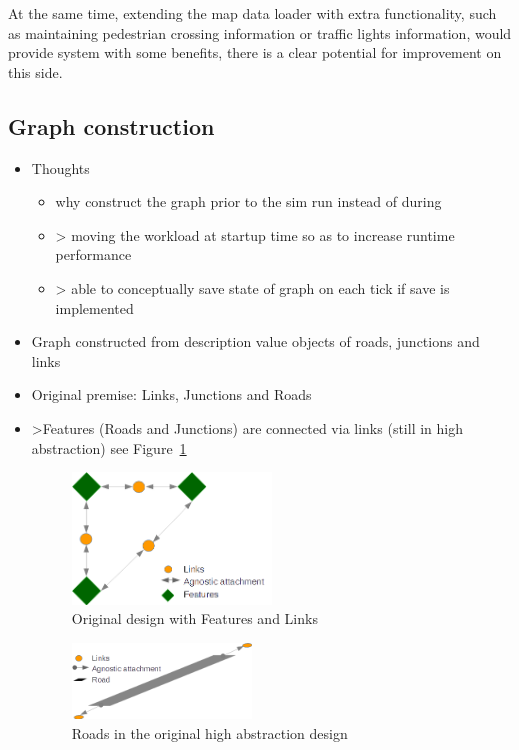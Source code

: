 At the same time, extending the map data loader with extra functionality, such as maintaining pedestrian crossing information or traffic lights information, would provide system with some benefits, there is a clear potential for improvement on this side.

\subsection{Graph construction}

\begin{itemize}
	\item Thoughts
    \begin{itemize}
        \item why construct the graph prior to the sim run instead of during
        \item > moving the workload at startup time so as to increase runtime performance
        \item > able to conceptually save state of graph on each tick if save is implemented
    \end{itemize}
    \item Graph constructed from description value objects of roads, junctions and links
    \item Original premise: Links, Junctions and Roads
    \item >Features (Roads and Junctions) are connected via links (still in high abstraction) see Figure~\ref{fig:FeatureConnect}

    \begin{figure}[h]
        \vspace{1.5em}
        \caption{Original design with Features and Links}
        \label{fig:FeatureConnect}
        \centering
        \includegraphics[width=0.50\textwidth]{figs/graphConstruction/OriginalConnections.png}
        \vspace{1.5em}
    \end{figure}

    \begin{figure}[h]
        \vspace{1.5em}
        \caption{Roads in the original high abstraction design}
        \label{fig:RoadsOriginal}
        \centering
        \includegraphics[width=0.45\textwidth]{figs/graphConstruction/OriginalRoads.png}
        \vspace{1.5em}
    \end{figure}


\end{itemize}
